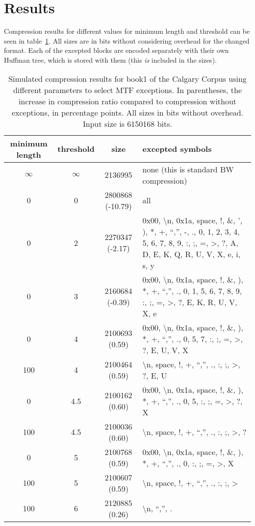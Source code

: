 \documentclass[a4paper]{scrreprt}
\begin{document}
\section{Results}

Compression results for different values for minimum length and threshold can be
seen in table~\ref{tab:resmtfexc}. All sizes are in bits without considering
overhead for the changed format. Each of the excepted blocks are encoded
separately with their own Huffman tree, which is stored with them (this
\emph{is} included in the sizes).

\begin{table}
\centering
\begin{tabularx}{\textwidth}{c|c|c|X}
minimum length & threshold & size & excepted symbols \\ \hline
\(\infty\) & \(\infty\) & 2136995 & none (this is standard BW compression) \\
0 & 0 & 2800868 (-10.79) & all \\
0 & 2 & 2270347 (-2.17) & 0x00, \textbackslash n, 0x1a, space, !, \&, ', ), *, +, ``,'',
-, ., 0, 1, 2, 3, 4, 5, 6, 7, 8, 9, :, ;, =, >, ?, A, D, E, K, Q, R, U, V, X, e,
i, s, y \\
0 & 3 & 2160684 (-0.39) & 0x00, \textbackslash n, 0x1a, space, !, \&, ), *, +,
``,'', ., 0, 1, 5, 6, 7, 8, 9, :, ;, =, >, ?, E, K, R, U, V, X, e \\
0 & 4 & 2100693 (0.59) & 0x00, \textbackslash n, 0x1a, space, !, \&, ), *, +, ``,'', .,
0, 5, 7, :, ;, =, >, ?, E, U, V, X \\
100 & 4 & 2100464 (0.59) & \textbackslash n, space, !, +, ``,'', ., :, ;, >, ?, E, U \\
0 & 4.5 & 2100162 (0.60) & 0x00, \textbackslash n, 0x1a, space, !, \&, ), *, +, ``,'',
., 0, 5, :, ;, =, >, ?, X \\
100 & 4.5 & 2100036 (0.60) & \textbackslash n, space, !, +, ``,'', ., :, ;, >, ? \\
0 & 5 & 2100768 (0.59) & 0x00, \textbackslash n, 0x1a, space, !, \&, ), *, +,
``,'', ., 0, :, ;, =, >, X \\
100 & 5 & 2100607 (0.59) & \textbackslash n, space, !, +, ``,'', ., :, ;, > \\
100 & 6 & 2120885 (0.26) & \textbackslash n, ``,'', . \\
\end{tabularx}
\label{tab:resmtfexc}
\caption{Simulated compression results for book1 of the Calgary Corpus using
different parameters to select MTF exceptions. In parentheses, the increase in
compression ratio compared to compression without exceptions, in percentage
points. All sizes in bits without overhead. Input size is 6150168 bits.}
\end{table}
\end{document}

